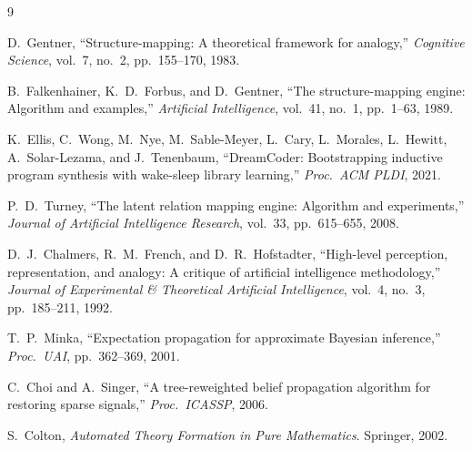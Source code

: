 \documentclass[12pt,a4paper]{article}
\begin{document}
\begin{thebibliography}{9}

D.~Gentner,
``Structure-mapping: A theoretical framework for analogy,''
\textit{Cognitive Science}, vol.~7, no.~2, pp.~155--170, 1983.

B.~Falkenhainer, K.~D.~Forbus, and D.~Gentner,
``The structure-mapping engine: Algorithm and examples,''
\textit{Artificial Intelligence}, vol.~41, no.~1, pp.~1--63, 1989.

K.~Ellis, C.~Wong, M.~Nye, M.~Sable-Meyer, L.~Cary, L.~Morales, L.~Hewitt,
A.~Solar-Lezama, and J.~Tenenbaum,
``DreamCoder: Bootstrapping inductive program synthesis with wake-sleep library learning,''
\textit{Proc.\ ACM PLDI}, 2021.

P.~D.~Turney,
``The latent relation mapping engine: Algorithm and experiments,''
\textit{Journal of Artificial Intelligence Research}, vol.~33, pp.~615--655, 2008.

D.~J.~Chalmers, R.~M.~French, and D.~R.~Hofstadter,
``High-level perception, representation, and analogy: A critique of artificial intelligence methodology,''
\textit{Journal of Experimental \& Theoretical Artificial Intelligence},
vol.~4, no.~3, pp.~185--211, 1992.

T.~P.~Minka,
``Expectation propagation for approximate Bayesian inference,''
\textit{Proc.\ UAI}, pp.~362--369, 2001.

C.~Choi and A.~Singer,
``A tree-reweighted belief propagation algorithm for restoring sparse signals,''
\textit{Proc.\ ICASSP}, 2006.

S.~Colton,
\textit{Automated Theory Formation in Pure Mathematics}.
Springer, 2002.

\end{thebibliography}
\end{document}
